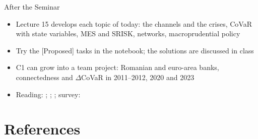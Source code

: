 \begin{frame}{After the Seminar}
\itemsize{\small}
\begin{itemize}
    \item Lecture 15 develops each topic of today: the channels and the crises, CoVaR with state variables, MES and SRISK, networks, macroprudential policy
    \item Try the [Proposed] tasks in the notebook; the solutions are discussed in class
    \item C1 can grow into a team project: Romanian and euro-area banks, connectedness and $\Delta$CoVaR in 2011--2012, 2020 and 2023
    \item Reading: ; ; ; survey: 
\end{itemize}
\end{frame}


\section{References}

